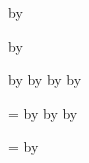 \newcount\CollaboratorJ
{}
\advance\CollaboratorCitations by \CollaboratorJ

\newcount\CollaboratorK
{}
\advance\CollaboratorCitations by \CollaboratorK



\newcount\TotalCitations
{}

\advance\TotalCitations by \FirstAuthorCitations
\advance\TotalCitations by \StudentAuthorCitations
\advance\TotalCitations by \CoauthorCitations
\advance\TotalCitations by \CollaboratorCitations


\newcount\FirstAuthorPublications
{}

\newcount\StudentPublications
{}

\newcount\CoauthorPublications
{}

\newcount\CollaborativePublications
{}

\newcount\AllPublications
\AllPublications=\FirstAuthorPublications
\advance\AllPublications by \StudentPublications
\advance\AllPublications by \CoauthorPublications
\advance\AllPublications by \CollaborativePublications

\newcount\AllCollaborativePublications
\AllCollaborativePublications=\CoauthorPublications
\advance\AllCollaborativePublications by \CollaborativePublications
